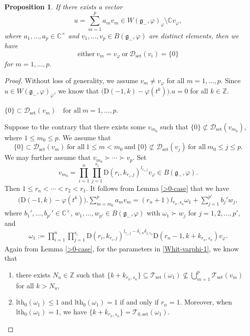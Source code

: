 \documentclass[12pt, a4paper]{amsart}
\newcommand{\fg}{\mathfrak g}
\newcommand{\C}{\mathbb{C}}
\newcommand{\Z}{\mathbb Z}
\newcommand{\rD}{\mathrm{D}}
\theoremstyle{Theorem}
\theoremstyle{Theorem}
\newtheorem{proposition}[thm]{Proposition}
\numberwithin{equation}{section}
\begin{document}
\begin{proposition}\label{reduce-to-0}
If there exists a vector
\[u=\sum_{m=1}^{p}a_{m}v_{m}\in W(\fg_{-},\varphi)_{\varphi}\setminus\C v_{\varphi},\]
where $a_{1},\dots,a_{p}\in\C^{\times}$ and $v_{1},\dots,v_{p}\in B(\fg_{-},\varphi)$ are distinct elements,
then we have
\[\text{either}\ v_{m}=v_{\varphi}\ \text{or}\ \mathcal{D}_{\mathrm{set}}(v_{i})=\{0\}\]
for $m=1,\dots,p$.
\end{proposition}
\begin{proof}Without loss of generality, we assume $v_{m}\neq v_{\varphi}$ for all $m=1,\dots,p$.
Since $u\in W(\fg_{-},\varphi)_{\varphi}$, we know that
$\big(\rD(-1,k)-\varphi(t^{k})\big).u=0$ for all $k\in\Z$.


\qquad $\{0\}\subset\mathcal{D}_{\mathrm{set}}(v_{m})\quad\text{for all}\ m=1,\dots,p$.

\noindent Suppose to the contrary that there exists some $v_{m_{0}}$ such that
$\{0\}\not\subset\mathcal{D}_{\mathrm{set}}(v_{m_{0}})$, where $1\leq m_{0}\leq p$. We assume that
\[\{0\}\subset\mathcal{D}_{\mathrm{set}}(v_{m})\ \text{for all}\ 1\leq m< m_{0}\ \text{and}\
\{0\}\not\subset\mathcal{D}_{\mathrm{set}}(v_{j})\ \text{for all}\ m_{0}\leq j\leq p.\]
We may further assume that $v_{m_{0}}\succ\cdots\succ v_{p}$.
Set \[v_{m_{0}}=\prod_{i=1}^{n}\prod_{j=1}^{s_{i}}
\rD(r_{i},k_{r_{i},j})^{l_{r_{i},j}}v_{\varphi}\in B(\fg_{-},\varphi).\]
Then $1\leq r_{n}<\cdots<r_{2}<r_{1}$. It follows from Lemma \ref{>0-case} that we have
\begin{eqnarray}\label{Whit-varphi-1}\big(\rD(-1,k)-\varphi(t^{k})\big).\sum_{m=m_{0}}^{p}a_{m}v_{m}
=(r_{n}+1)l_{r_{n},s_{n}}\omega_{1}+\sum_{j=1}^{p'}b_{j}'w_{j},
\end{eqnarray}
where $b_{1}',\dots,b_{p'}'\in\C^{\times}$, $w_{1},\dots,w_{p'}\in B(\fg_{-},\varphi)$
with $\omega_{1}\succ w_{j}$ for $j=1,2,\dots,p'$, and
\begin{eqnarray*}\omega_{1}:=\prod_{i=1}^{n}\prod_{j=1}^{s_{i}}
\rD(r_{i},k_{r_{i},j})^{l_{r_{i},j}-\delta_{i,n}\delta_{j,s_{n}}}\rD(r_{n}-1,k+k_{r_{n},s_{n}})v_{\varphi}.
\end{eqnarray*}
Again from Lemma \ref{>0-case}, for the parameters in \eqref{Whit-varphi-1}, we know that
\begin{enumerate}
\item[(c1)] there exists $N_{u}\in\Z$ such that
$\{k+k_{r_{n},s_{n}}\}\subseteq\mathcal{T}_{\mathrm{set}}(\omega_{1})
\nsubseteq\bigcup_{m=1}^{p}\mathcal{T}_{\mathrm{set}}(v_{m})$ for all $k>N_{u}$,
\item[(c2)] $\mathrm{lth}_{0}(\omega_{1})\leq1$ and $\mathrm{lth}_{0}(\omega_{1})=1$ if and only if $r_{n}=1$.
Moreover, when $\mathrm{lth}_{0}(\omega_{1})=1$, we have
$\{k+k_{r_{n},s_{n}}\}=\mathcal{T}_{0,\mathrm{set}}(\omega_{1})$.
\end{enumerate}



\end{proof}
\end{document}

